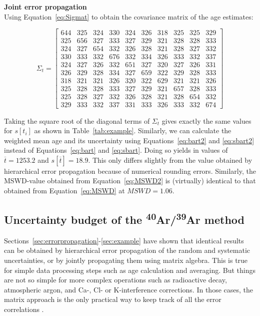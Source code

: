 \documentclass{article}
\begin{document}
\noindent\textbf{Joint error propagation}\\

Using Equation~\ref{eq:Sigmat} to obtain the covariance matrix of the
age estimates:

\begin{equation}
  \Sigma_t = \left[
    \begin{array}{cccccccccc}
 644 & 325 & 324 & 330 & 324 & 326 & 318 & 325 & 325 & 329 \\
 325 & 656 & 327 & 333 & 327 & 329 & 321 & 328 & 328 & 333 \\
 324 & 327 & 654 & 332 & 326 & 328 & 321 & 328 & 327 & 332 \\
 330 & 333 & 332 & 676 & 332 & 334 & 326 & 333 & 332 & 337 \\
 324 & 327 & 326 & 332 & 651 & 327 & 320 & 327 & 326 & 331 \\
 326 & 329 & 328 & 334 & 327 & 659 & 322 & 329 & 328 & 333 \\
 318 & 321 & 321 & 326 & 320 & 322 & 629 & 321 & 321 & 326 \\
 325 & 328 & 328 & 333 & 327 & 329 & 321 & 657 & 328 & 333 \\
 325 & 328 & 327 & 332 & 326 & 328 & 321 & 328 & 654 & 332 \\
 329 & 333 & 332 & 337 & 331 & 333 & 326 & 333 & 332 & 674
    \end{array}
    \right]
\end{equation}

Taking the square root of the diagonal terms of $\Sigma_t$ gives
exactly the same values for $s[t_i]$ as shown in
Table~\ref{tab:example}. Similarly, we can calculate the weighted mean
age and its uncertainty using Equations~\ref{eq:bart2} and
\ref{eq:sbart2} instead of Equations~\ref{eq:bart} and
\ref{eq:sbart}. Doing so yields in values of $\overline{t} = 1253.2$
and $s[\overline{t}] = 18.9$.  This only differs slightly from the
value obtained by hierarchical error propagation because of numerical
rounding errors. Similarly, the MSWD-value obtained from
Equation~\ref{eq:MSWD2} is (virtually) identical to that obtained from
Equation~\ref{eq:MSWD} at $MSWD = 1.06$.

\subsection{Uncertainty budget of the \textsuperscript{40}Ar/\textsuperscript{39}Ar method}
\label{sec:budget}

Sections~\ref{sec:errorpropagation}-\ref{sec:example} have shown that
identical results can be obtained by hierarchical error propagation of
the random and systematic uncertainties, or by jointly propagating
them using matrix algebra. This is true for simple data processing
steps such as age calculation and averaging. But things are not so
simple for more complex operations such as radioactive decay,
atmospheric argon, and Ca-, Cl- or K-interference corrections. In
those cases, the matrix approach is the only practical way to keep
track of all the error correlations \citep{vermeesch2015b}.\\
\end{document}
